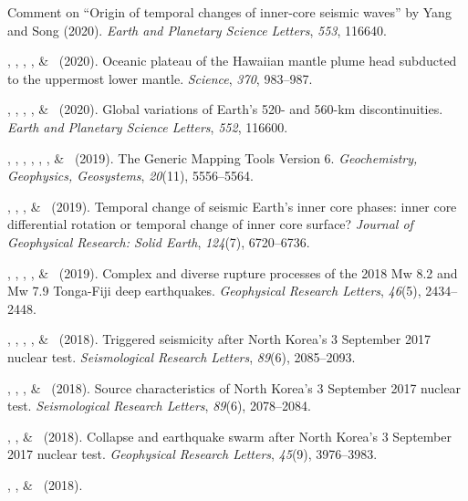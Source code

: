 \begin{etaremune}
    Comment on ``Origin of temporal changes of inner-core seismic waves'' by Yang and Song (2020).
    \emph{Earth and Planetary Science Letters}, \emph{553}, 116640.
\item \SWei\CS, \PShearer, \CLithgowBertelloni, \LStixrude, \& \Me\ (2020).
    Oceanic plateau of the Hawaiian mantle plume head subducted to the uppermost lower mantle.
    \emph{Science}, \emph{370}, 983--987.
\item \Me\CS, \MLv, \SWei, \SDorfman, \& \PShearer\ (2020).
    Global variations of Earth's 520- and 560-km discontinuities.
    \emph{Earth and Planetary Science Letters}, \emph{552}, 116600. \\
\item
    \PWessel\CS, \JLuis, \LUieda, \RScharroo, \FWobbe, \WSmith, \& \Me\ (2019).
    The Generic Mapping Tools Version 6.
    \emph{Geochemistry, Geophysics, Geosystems}, \emph{20}(11), 5556--5564.
\item
    \JYao\CS, \Me, \LSun, \& \LWen\ (2019).
    Temporal change of seismic Earth's inner core phases: inner core differential rotation or temporal change of inner core surface?
    \emph{Journal of Geophysical Research: Solid Earth}, \emph{124}(7), 6720--6736.
\item
    \WFan\CS, \SWei, \Me, \JMcGurie, \& \DWiens\ (2019).
    Complex and diverse rupture processes of the 2018 Mw 8.2 and Mw 7.9 Tonga-Fiji deep earthquakes.
    \emph{Geophysical Research Letters}, \emph{46}(5), 2434--2448.
\item
    \JYao\CF\CS, \Me\CF, \ZLu, \LSun, \& \LWen\ (2018).
    Triggered seismicity after North Korea's 3 September 2017 nuclear test.
    \emph{Seismological Research Letters}, \emph{89}(6), 2085--2093.
\item
    \JYao\CF\CS, \Me\CF, \LSun, \& \LWen\ (2018).
    Source characteristics of North Korea's 3 September 2017 nuclear test.
    \emph{Seismological Research Letters}, \emph{89}(6), 2078--2084.
\item
    \Me\CF\CS, \JYao\CF, \& \LWen\ (2018).
    Collapse and earthquake swarm after North Korea's 3 September 2017 nuclear test.
    \emph{Geophysical Research Letters}, \emph{45}(9), 3976--3983.
\item
    \LWen\CS, \Me, \& \JYao\ (2018).

\end{etaremune}
